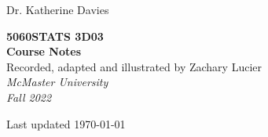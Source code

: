 \documentclass[12pt,notitlepage]{article}
\makeatletter
\theoremstyle{theoremc}
\numberwithin{amstheorem}{section}
\numberwithin{amsdefinition}{section}
\numberwithin{amsexample}{section}
\newcommand\HUGE{\@setfontsize\Huge{50}{60}}
\makeatother
\begin{document}
\AddToShipoutPicture*{\bgpic}

\begin{titlepage} %

    \raggedleft
    
    \vspace*{\baselineskip}
    
    {\Large Dr. Katherine Davies} %
    
    \vspace*{0.167\textheight} %
    
    \textbf{\color{main}\HUGE STATS 3D03}\\[\baselineskip] %
    \textbf{\color{main}\Huge Course Notes}\\[\baselineskip] %

    {\Large Recorded, adapted and illustrated by Zachary Lucier}\\[1.5\baselineskip]
    
    {\Large \textit{McMaster University}}\\[0.5\baselineskip]
    {\Large \textit{Fall 2022}}

    \vspace*{0.167\textheight}

    Last updated \today
    

    

\end{titlepage}

\tableofcontents



\break

\setcounter{section}{1}

\end{document}
